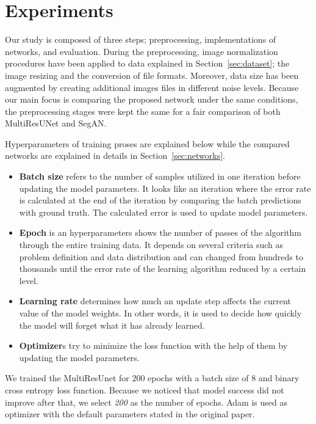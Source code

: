 \section{Experiments}

    Our study is composed of three steps; preprocessing, implementations of networks, and evaluation.
    During the preprocessing, image normalization procedures have been applied to data explained in Section~\ref{sec:dataset};
    the image resizing and the conversion of file formats.
    Moreover, data size has been augmented by creating additional images files in different noise levels.
    Because our main focus is comparing the proposed network under the same conditions,
    the preprocessing stages were kept the same for a fair comparison of both MultiResUNet and SegAN.

    Hyperparameters of training proses are explained below while the compared networks are explained in details in Section~\ref{sec:networks}.

    \begin{itemize}

        \item \textbf{Batch size} refers to the number of samples utilized in one iteration before updating the model parameters.
        It looks like an iteration where the error rate is calculated at the end of the iteration by comparing the batch predictions with ground truth.
        The calculated error is used to update model parameters.

        \item \textbf{Epoch} is an hyperparameters shows the number of passes of the algorithm through the entire training data.
        It depends on several criteria such as problem definition and data distribution and can changed from hundreds to thousands
        until the error rate of the learning algorithm reduced by a certain level.

        \item \textbf{Learning rate} determines how much an update step affects the current value of the model weights.
        In other words, it is used to decide how quickly the model will forget what it has already learned.

        \item \textbf{Optimizer}s try to minimize the loss function with the help of them by updating the model parameters.

    \end{itemize}

    We trained the MultiResUnet for $200$ epochs with a batch size of $8$ and binary cross entropy loss function.
    Because we noticed that model success did not improve after that, we select \emph{200} as the number of epochs.
    Adam is used as optimizer with the default parameters stated in the original paper.


